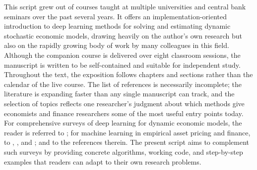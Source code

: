 \documentclass[11pt,a4paper]{report}
\begin{document}
This script grew out of courses taught at multiple universities and central bank seminars over the past several years.  It offers an implementation-oriented introduction to deep learning methods for solving and estimating dynamic stochastic economic models, drawing heavily on the author's own research but also on the rapidly growing body of work by many colleagues in this field.  Although the companion course is delivered over eight classroom sessions, the manuscript is written to be self-contained and suitable for independent study.  Throughout the text, the exposition follows chapters and sections rather than the calendar of the live course.  The list of references is necessarily incomplete; the literature is expanding faster than any single manuscript can track, and the selection of topics reflects one researcher's judgment about which methods give economists and finance researchers some of the most useful entry points today.  For comprehensive surveys of deep learning for dynamic economic models, the reader is referred to \citet{fernandezvillaverde2024taming}; for machine learning in empirical asset pricing and finance, to \citet{gukellyxiu2020}, \citet{nagel2021mlap}, and \citet{kellyxiu2023fml}; and to the references therein.  The present script aims to complement such surveys by providing concrete algorithms, working code, and step-by-step examples that readers can adapt to their own research problems.
\end{document}
